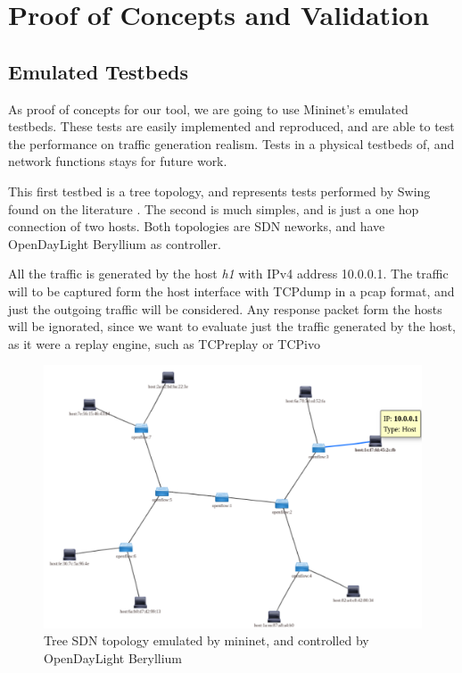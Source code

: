 \chapter{Proof of Concepts and Validation}\label{ch:validation}

\section{Emulated Testbeds}


As proof of concepts for our tool, we are going to use Mininet's emulated testbeds. These tests are easily implemented and reproduced, and are able to test the performance on traffic generation realism. Tests in a physical testbeds of, and network functions stays for future work.

This first testbed is a tree topology, and represents tests performed by Swing\cite{swing-paper} found on the literature \cite{background-traffic-matter}\cite{legotg-paper}. The second is much simples, and is just a one hop connection of two hosts. Both topologies are SDN neworks, and have OpenDayLight Beryllium as controller. 


All the traffic is generated by the host \textit{h1} with IPv4 address 10.0.0.1. The traffic will to be captured form the host interface with TCPdump in a pcap format, and just the outgoing traffic will be considered. Any response packet form the hosts will be ignorated, since we want to evaluate just the traffic generated by the host, as it were a replay engine, such as TCPreplay or TCPivo\cite{tcpivo-paper}


\begin{figure}[!ht]
	\centering
	\includegraphics[scale=0.4]{figures/ch5/topo-tree}
	\caption{Tree SDN topology emulated by mininet, and controlled by OpenDayLight Beryllium}
	\label{fig:topo-tree}
\end{figure}

